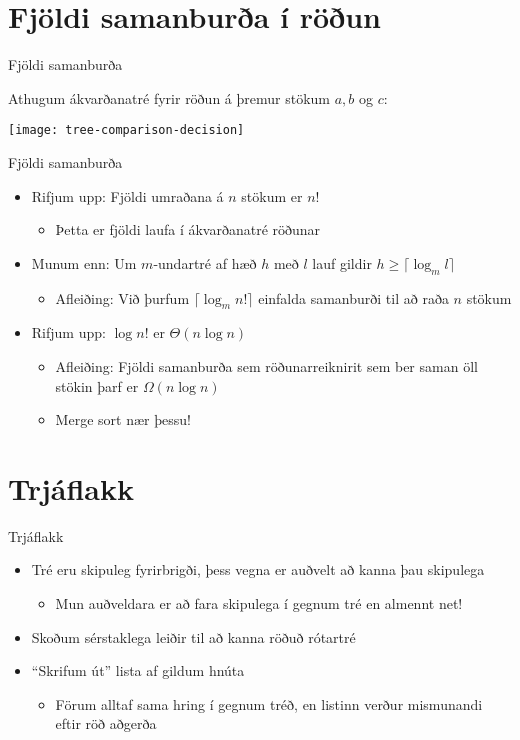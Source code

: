 \documentclass[handout]{beamer}
\begin{document}
\section{Fjöldi samanburða í röðun}

\begin{frame}{Fjöldi samanburða}
\begin{center}
Athugum ákvarðanatré fyrir röðun á þremur stökum $a, b$ og $c$:

\texttt{[image: tree-comparison-decision]}
\end{center}
\end{frame}

\begin{frame}{Fjöldi samanburða}
\begin{itemize}
 \item Rifjum upp: Fjöldi umraðana á $n$ stökum er $n!$
 \begin{itemize}
  \item Þetta er fjöldi laufa í ákvarðanatré röðunar
 \end{itemize}
 \item Munum enn: Um $m$-undartré af hæð $h$ með $l$ lauf gildir $h \geq \lceil \log_m l\rceil$
 \begin{itemize}
  \item Afleiðing: Við þurfum $\lceil \log_m n! \rceil$ einfalda samanburði til að raða $n$ stökum
 \end{itemize}
 \item Rifjum upp: $\log n!$ er $\Theta(n \log n)$
 \begin{itemize}
  \item Afleiðing: Fjöldi samanburða sem röðunarreiknirit sem ber saman öll stökin þarf er $\Omega(n\log n)$
  \item Merge sort nær þessu!
 \end{itemize}
\end{itemize}
\end{frame}

\section{Trjáflakk}

\begin{frame}{Trjáflakk}
\begin{itemize}
 \item Tré eru skipuleg fyrirbrigði, þess vegna er auðvelt að kanna þau skipulega
 \begin{itemize}
  \item Mun auðveldara er að fara skipulega í gegnum tré en almennt net!
 \end{itemize}
 \item Skoðum sérstaklega leiðir til að kanna röðuð rótartré
 \item ``Skrifum út'' lista af gildum hnúta
 \begin{itemize}
  \item Förum alltaf sama hring í gegnum tréð, en listinn verður mismunandi eftir röð aðgerða
 \end{itemize}
\end{itemize}
\end{frame}
\end{document}
